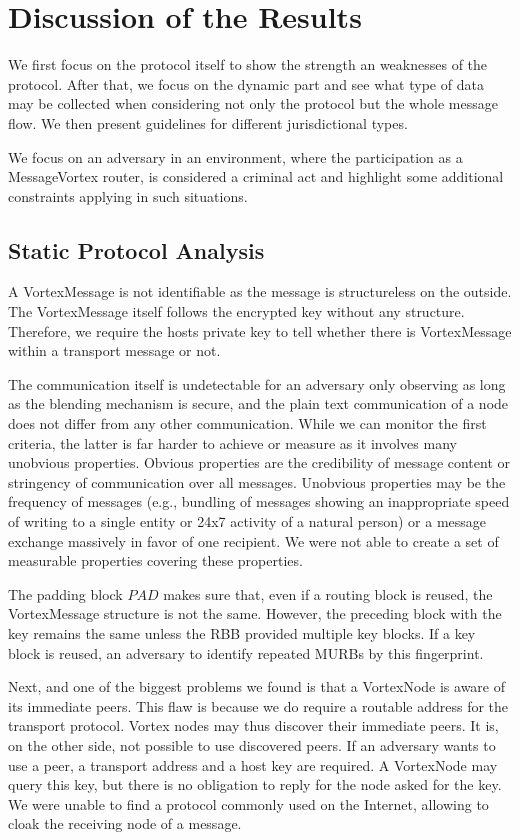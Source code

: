 \documentclass[10pt,journal,compsoc,twocolumn,twoside]{IEEEtran}
\begin{document}
\section{Discussion of the Results\label{sec:discussion}}
We first focus on the protocol itself to show the strength an weaknesses of the protocol. After that, we focus on the dynamic part and see what type of data may be collected when considering not only the protocol but the whole message flow. We then present guidelines for different jurisdictional types.

We focus on an adversary in an environment, where the participation as a MessageVortex router, is considered a criminal act and highlight some additional constraints applying in such situations.

\subsection{Static Protocol Analysis\label{sec:staticAnalysis}}
A VortexMessage is not identifiable as the message is structureless on the outside. The VortexMessage itself follows the encrypted key without any structure. Therefore, we require the hosts private key to tell whether there is VortexMessage within a transport message or not.

The communication itself is undetectable for an adversary only observing as long as the blending mechanism is secure, and the plain text communication of a node does not differ from any other communication. While we can monitor the first criteria, the latter is far harder to achieve or measure as it involves many unobvious properties. Obvious properties are the credibility of message content or stringency of communication over all messages. Unobvious properties may be the frequency of messages (e.g., bundling of messages showing an inappropriate speed of writing to a single entity or 24x7 activity of a natural person) or a message exchange massively in favor of one recipient. We were not able to create a set of measurable properties covering these properties.

The padding block $PAD$ makes sure that, even if a routing block is reused, the VortexMessage structure is not the same. However, the preceding block with the key remains the same unless the RBB provided multiple key blocks. If a key block is reused, an adversary to identify repeated MURBs by this fingerprint.


Next, and one of the biggest problems we found is that a VortexNode is aware of its immediate peers. This flaw is because we do require a routable address for the transport protocol. Vortex nodes may thus discover their immediate peers. It is, on the other side, not possible to use discovered peers. If an adversary wants to use a peer, a transport address and a host key are required. A VortexNode may query this key, but there is no obligation to reply for the node asked for the key. We were unable to find a protocol commonly used on the Internet, allowing to cloak the receiving node of a message.
\end{document}

